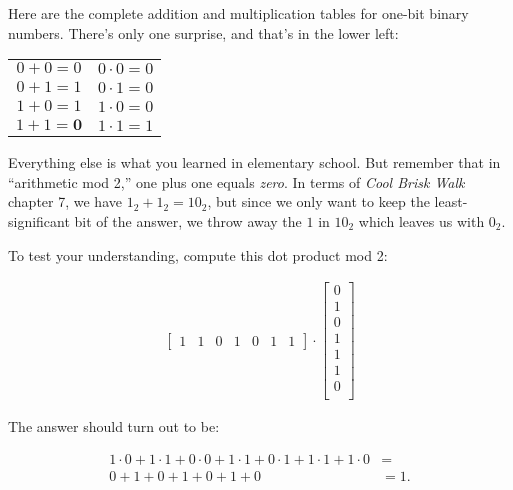 Here are the complete addition and multiplication tables for one-bit binary
numbers. There's only one surprise, and that's in the lower left:

\vspace{-.15in}
\begin{center}
\setlength{\tabcolsep}{40pt}
\begin{tabular}{cc}
$0+0 = 0$ & $0\cdot 0 = 0$ \\
$0+1 = 1$ & $0\cdot 1 = 0$ \\
$1+0 = 1$ & $1\cdot 0 = 0$ \\
$1+1 = \textbf{0}$ & $1\cdot 1 = 1$ \\
\end{tabular}
\end{center}
\vspace{-.15in}

Everything else is what you learned in elementary school. But remember that in
``arithmetic mod 2,'' one plus one equals \textit{zero}. In terms of
\textit{Cool Brisk Walk} chapter 7, we have $1_2 + 1_2 = 10_2$, but since we
only want to keep the least-significant bit of the answer, we throw away the
$1$ in $10_2$ which leaves us with $0_2$.

To test your understanding, compute this dot product mod 2:

\vspace{-.15in}
\begin{align*}
\begin{bmatrix}
1 & 1 & 0 & 1 & 0 & 1 & 1
\end{bmatrix} \cdot
\begin{bmatrix}
0 \\ 1 \\ 0 \\ 1 \\ 1 \\ 1 \\ 0 \\
\end{bmatrix}
\end{align*}
\vspace{-.15in}

The answer should turn out to be:

\vspace{-.15in}
\begin{align*}
1\cdot 0 + 
1\cdot 1 + 
0\cdot 0 + 
1\cdot 1 + 
0\cdot 1 + 
1\cdot 1 + 
1\cdot 0 &= \\
0 + 
1 + 
0 + 
1 + 
0 + 
1 + 
0 &= 1.
\end{align*}
\vspace{-.15in}

